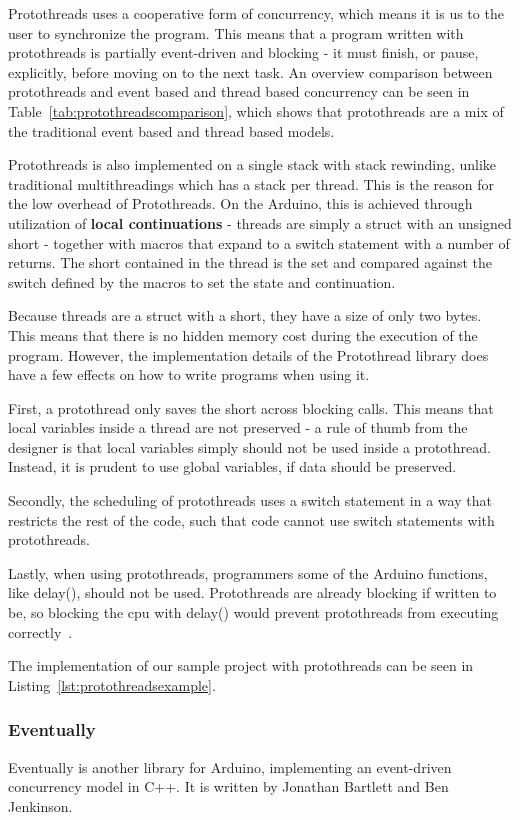 Protothreads uses a cooperative form of concurrency, which means it is us to the user to synchronize the program. This means that a program written with protothreads is partially event-driven and blocking - it must finish, or pause, explicitly, before moving on to the next task. An overview comparison between protothreads and event based and thread based concurrency can be seen in Table~\ref{tab:protothreadscomparison}, which shows that protothreads are a mix of the traditional event based and thread based models.

Protothreads is also implemented on a single stack with stack rewinding, unlike traditional multithreadings which has a stack per thread. This is the reason for the low overhead of Protothreads. On the Arduino, this is achieved through utilization of \textbf{local continuations} - threads are simply a struct with an unsigned short - together with macros that expand to a switch statement with a number of returns. The short contained in the thread is the set and compared against the switch defined by the macros to set the state and continuation.

Because threads are a struct with a short, they have a size of only two bytes. This means that there is no hidden memory cost during the execution of the program. However, the implementation details of the Protothread library does have a few effects on how to write programs when using it.

First, a protothread only saves the short across blocking calls. This means that local variables inside a thread are not preserved - a rule of thumb from the designer is that local variables simply should not be used inside a protothread. Instead, it is prudent to use global variables, if data should be preserved.

Secondly, the scheduling of protothreads uses a switch statement in a way that restricts the rest of the code, such that code cannot use switch statements with protothreads.

Lastly, when using protothreads, programmers some of the Arduino functions, like delay(), should not be used. Protothreads are already blocking if written to be, so blocking the cpu with delay() would prevent protothreads from executing correctly~\cite{AdamDunkelProtothreads}.

The implementation of our sample project with protothreads can be seen in Listing~\ref{lst:protothreadsexample}.


\subsubsection{Eventually}
Eventually is another library for Arduino, implementing an event-driven concurrency model in C++. It is written by Jonathan Bartlett and Ben Jenkinson.


